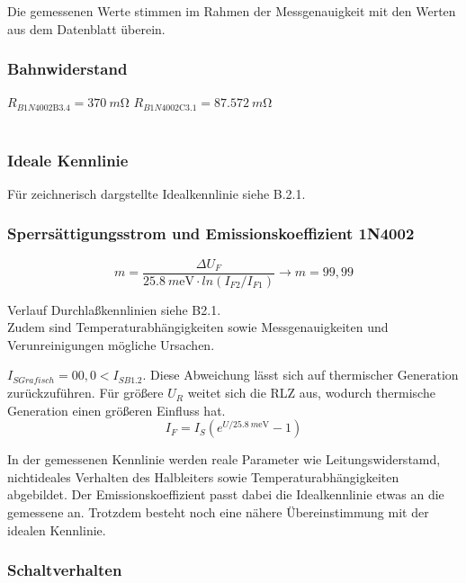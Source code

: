 \documentclass[
	a4paper, %
	12pt, %
]{CSUniSchoolLabReport}
\newcommand{\milli}{m}
\begin{document}
Die gemessenen Werte stimmen im Rahmen der Messgenauigkeit mit den Werten aus dem Datenblatt überein.

\subsubsection{Bahnwiderstand}
$R_{B1N4002\text{B3.4}} = \SI{370}{\milli\ohm}$ \qquad\qquad $R_{B1N4002\text{C3.1}} = \SI{87.572}{\milli\ohm}$\\\\

\subsubsection{Ideale Kennlinie}
Für zeichnerisch dargstellte Idealkennlinie siehe B.2.1.

\subsubsection{Sperrsättigungsstrom und Emissionskoeffizient 1N4002}
\vspace{1em} 
\[
m = \frac{\Delta U_F}{\SI{25.8}{\milli\electronvolt}\cdot ln(I_{F2}/I_{F1})} \rightarrow m = 99,99
\]
\vspace{1em}

Verlauf Durchlaßkennlinien siehe B2.1.\\

Zudem sind Temperaturabhängigkeiten sowie Messgenauigkeiten und Verunreinigungen mögliche Ursachen. 

$I_{S Grafisch} = 00,0 < I_{S B1.2}$. Diese Abweichung lässt sich auf thermischer Generation zurückzuführen. Für größere $U_R$ weitet sich die RLZ aus, wodurch thermische Generation einen größeren Einfluss hat. 
\[
I_F = I_S(e^{U/\SI{25.8}{\milli\electronvolt}}-1)
\]

In der gemessenen Kennlinie werden reale Parameter wie Leitungswiderstamd, nichtideales Verhalten des Halbleiters sowie Temperaturabhängigkeiten abgebildet.
Der Emissionskoeffizient passt dabei die Idealkennlinie etwas an die gemessene an. Trotzdem besteht noch eine nähere Übereinstimmung mit der idealen Kennlinie.

\subsubsection{Schaltverhalten}
\end{document}
